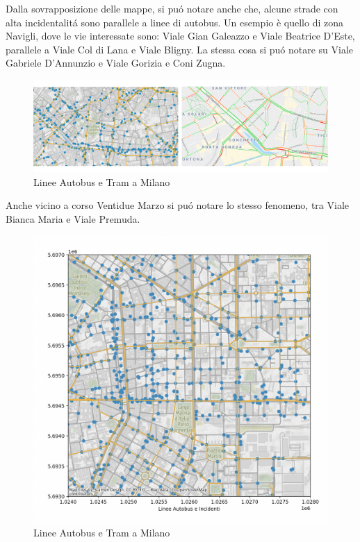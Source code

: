 \documentclass[a4paper]{report}
\begin{document}


Dalla sovrapposizione delle mappe, si pu\'o notare anche che, alcune strade con alta incidentalit\'a 
sono parallele a linee di autobus. Un esempio è quello di zona Navigli, 
dove le vie interessate sono:
Viale Gian Galeazzo e Viale Beatrice D'Este, parallele a Viale Col di Lana e Viale Bligny.
La stessa cosa si pu\'o notare su Viale Gabriele D'Annunzio e Viale Gorizia e Coni Zugna.

\begin{figure}
    \includegraphics[width=\linewidth]{../src/atm/navigli.png}
    \caption{Linee Autobus e Tram a Milano}
    \label{fig:navigli}
\end{figure}


Anche vicino a corso Ventidue Marzo si pu\'o notare lo stesso fenomeno, 
tra Viale Bianca Maria e Viale Premuda.

\begin{figure}
    \includegraphics[width=\linewidth]{../src/atm/22_marzo.png}
    \caption{Linee Autobus e Tram a Milano}
    \label{fig:22_marzo}
\end{figure}
\end{document}
